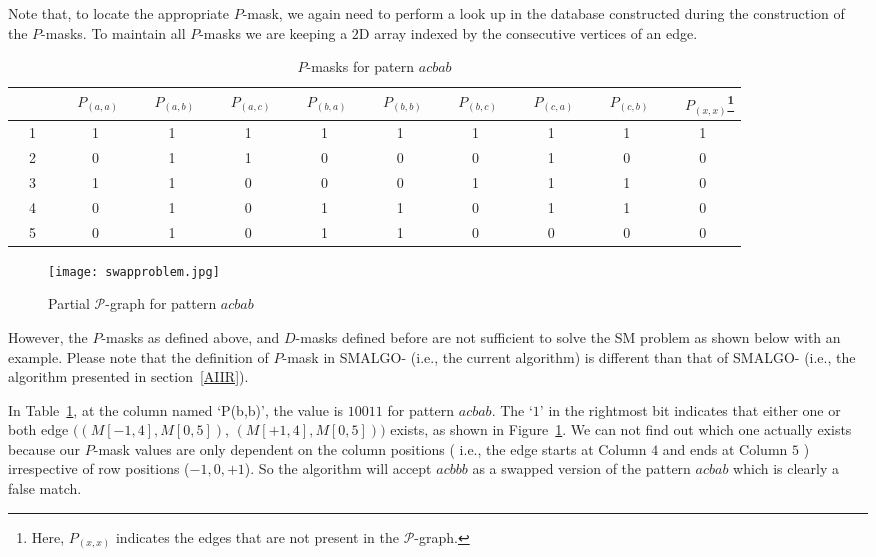 \documentclass{llncs}
\newcommand{\rom}[1]{\uppercase\expandafter{\romannumeral #1\relax}}
\begin{document}
{Note that, to locate the appropriate $P$-mask, we again need to perform a look up in the database constructed during the construction of the $P$-masks. To maintain all $P$-masks we are keeping a $2$D array indexed by the consecutive vertices of an edge.


\begin{table}
\begin{center}
\begin{minipage}{\textwidth}
\begin{tabular}{|c|c|c|c|c|c|c|c|c|c|}
\hline
~ ~ ~ &~ $P_{(a,a)}$~ &~ $P_{(a,b)}$~ &~ $P_{(a,c)}$~ &~ $P_{(b,a)}$~ &~ $P_{(b,b)}$~ &~ $P_{(b,c)}$~ &~ $P_{(c,a)}$~ &~ $P_{(c,b)}$~ &~ $P_{(x,x)}$\footnote{Here, $P_{(x,x)}$ indicates the edges that are not present in the $\mathcal{P}$-graph.}\\
\hline
1&1&1&1&1&1&1&1&1&1\\
\hline
2&0&1&1&0&0&0&1&0&0\\
\hline
3&1&1&0&0&0&1&1&1&0\\
\hline
4&0&1&0&1&1&0&1&1&0\\
\hline
5&0&1&0&1&1&0&0&0&0\\
\hline
\end{tabular}
\end{minipage}
\caption{$P$-masks for patern $acbab$}
\label{newP_mask}
\end{center}
\end{table}


\begin{figure}[hbtp]
\begin{center}
\texttt{[image: swapproblem.jpg]}
\caption{Partial $\mathcal P$-graph for pattern $acbab$ } \label{swapproblem}
\end{center}
\end{figure}


However, the $P$-masks as defined above, and $D$-masks defined before are not sufficient to solve the SM problem as shown below with an example. Please note that the definition of $P$-mask in SMALGO-\rom{2} (i.e., the current algorithm) is different than that of SMALGO-\rom{1} (i.e., the algorithm presented in section~\ref{AIIR}).

\begin{example}\label{columnProblem}
In Table~\ref{newP_mask}, at the column named `P(b,b)', the value is $10011$ for pattern $acbab$. The `$1$' in the rightmost bit indicates that either one or both edge $((M[-1,4],M[0,5])$, $(M[+1,4],M[0,5]))$ exists, as shown in Figure~\ref{swapproblem}. We can not find out which one actually exists because our $P$-mask values are only dependent on the column positions ( i.e., the edge starts at Column $4$ and ends at Column $5$ ) irrespective of row positions ($-1, 0, +1$). So the algorithm will accept $acbbb$ as a swapped version
of the pattern $acbab$ which is clearly a false match.
\end{example} 




}
\end{document}
